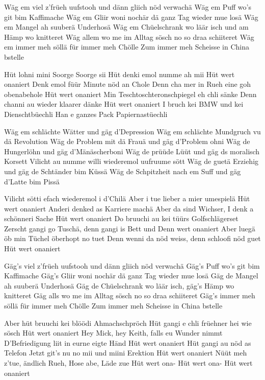 \medskip

\begin{guitar}
  Wäg em viel z'früeh uufstooh und dänn gliich nöd verwachä
  Wäg em Puff wo's git bim Kaffimache
  Wäg em Gliir woni nochär dä ganz Tag wieder mue losä
  Wäg em Mangel ah suuberä Underhosä
  Wäg em Chüelschrank wo läär isch und am Hämp wo knitteret
  Wäg allem wo me im Alltag sösch no so draa schiiteret
  Wäg em immer meh söllä für immer meh Chölle
  Zum immer meh Scheisse in China bstelle

  Hüt lohni mini Soorge Soorge sii
  Hüt denki emol numme ah mii
  Hüt wert onaniert
  Denk emol füür Minute nöd an Chole
  Denn cha mer in Rueh eine goh obenabehole
  Hüt wert onaniert
  Min Teschtoschteronschpiegel eh chli sänke
  Denn channi au wieder klaarer dänke
  Hüt wert onaniert
  I bruch kei BMW und kei Dienschtbüechli
  Han e ganzes Pack Papiernastüechli

  Wäg em schlächte Wätter und gäg d'Depression
  Wäg em schlächte Mundgruch vu dä Revolution
  Wäg de Problem mit dä Frauä und gäg d'Problem ohni
  Wäg de Hungerlöhn und gäg d'Mänäscherboni
  Wäg de prüüde Lüüt und gäg ds moralisch Korsett
  Vilicht au numme willi wiederemol uufruume sött
  Wäg de guetä Erziehig und gäg de Schtänder bim Küssä
  Wäg de Schpitzheit nach em Suff und gäg d'Latte bim Pissä

  \newpage

  Vilicht sötti efach wiederemol i d'Chilä
  Aber i tue lieber a mier umespielä
  Hüt wert onaniert
  Anderi denked as Karriere machä
  Aber da sind Wichser, I denk a schönneri Sache
  Hüt wert onaniert
  Do bruuchi au kei tüürs Golfschlägerset
  Zerscht gangi go Tuschä, denn gangi is Bett und
  Denn wert onaniert
  Aber luegä öb min Tüchel öberhopt no tuet
  Denn wenni da nöd weiss, denn schloofi nöd guet
  Hüt wert onaniert

  Gäg's viel z'früeh uufstooh und dänn gliich nöd verwachä
  Gäg's Puff wo's git bim Kaffimache
  Gäg's Gliir woni nochär dä ganz Tag wieder mue losä
  Gäg de Mangel ah suuberä Underhosä
  Gäg de Chüelschrank wo läär isch, gäg's Hämp wo knitteret
  Gäg alls wo me im Alltag sösch no so draa schiiteret
  Gäg's immer meh söllä für immer meh Chölle
  Zum immer meh Scheisse in China bstelle

  Aber hüt bruuchi kei blöödi Ahmachschpröch
  Hüt gangi e chli früehner hei wie sösch
  Hüt wert onaniert
  Hey Mick, hey Keith, falls eu Wunder nimmt
  D'Befriedigung liit in eurne eigte Händ
  Hüt wert onaniert
  Hüt gangi au nöd as Telefon
  Jetzt git's nu no mii und miini Erektion
  Hüt wert onaniert
  Nüüt meh z'tue, ändlich Rueh, Hose abe, Läde zue
  Hüt wert ona-
  Hüt wert ona-
  Hüt wert onaniert
\end{guitar}
